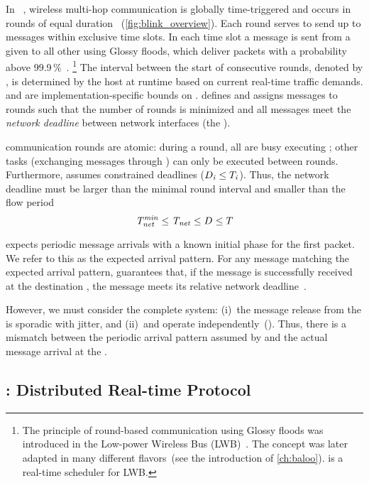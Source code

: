 In \blink~\cite{zimmerling2017Blink}, wireless multi-hop communication is globally time-triggered and occurs in {rounds} of equal {duration} \rlength~(\cref{fig:blink_overview}).
Each round serves to send up to \nslotsmax messages within exclusive time slots.
In each time slot a message is sent from a given \cp to all other \CPs using Glossy floods, which deliver packets with a probability above 99.9\,\%~\cite{ferrari2011Glossy}.%
%
\footnote{The principle of round-based communication using Glossy floods was introduced in the Low-power Wireless Bus (LWB)~\cite{ferrari2012LWB}. The concept was later adapted in many different flavors~(see the introduction of \cref{ch:baloo}).
\blink is a real-time scheduler for LWB.}
%
The interval between the start of consecutive rounds, denoted by \rperiod, is determined by the host at runtime based on current real-time traffic demands. \rperiodmin and \rperiodmax are implementation-specific bounds on \rperiod.
\blink defines \rperiod and assigns messages to rounds such that the number of rounds is minimized and all messages meet the \emph{network deadline} \ndeadlinei between network interfaces (\ie the \CPs).

\blink communication rounds are atomic: during a round, all \CPs are busy executing \blink; other tasks (\eg exchanging messages through \bolt) can only be executed between rounds.
Furthermore, \blink assumes constrained deadlines ($D_{\mathit{i}} \leq T_{\mathit{i}}$).
Thus, the network deadline \ndeadlineany must be larger than the minimal round interval and smaller than the flow period \periodany
\begin{equation}
  \mathit{T_{net}^{min}} \leq \mathit{T_{net}} \leq D_{\mathit{}} \leq T_{\mathit{}}
\end{equation}

\blink expects periodic message arrivals with a known initial phase for the first packet.
We refer to this as the expected arrival pattern.
For any message matching the expected arrival pattern,
\blink guarantees that, if the message is successfully received at the destination \cp, the message meets its relative network deadline~\ndeadlineany.%

However, we must consider the complete system:
(i)~the message release from the \APs is sporadic with jitter, and
(ii)~\APs and \CPs operate independently~(). Thus, there is a mismatch between the periodic arrival pattern assumed by \blink and the actual message arrival at the \CPs.

\subsection{\DRP: Distributed Real-time Protocol}
\label{subsec:drp}

